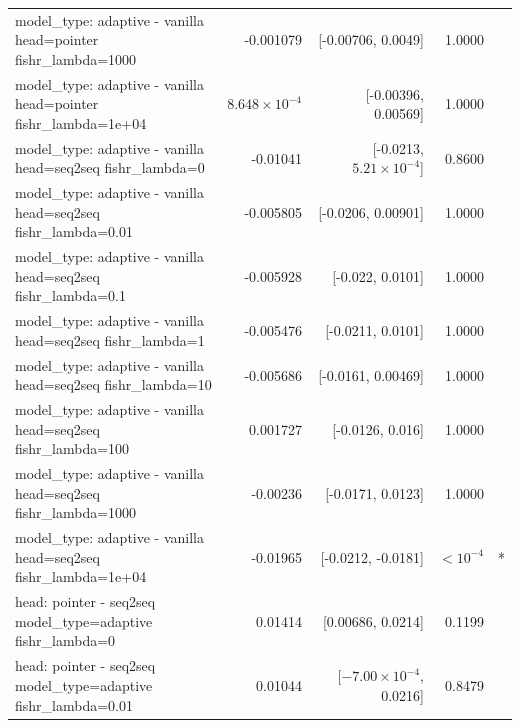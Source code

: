 \documentclass[10pt]{article}
\makeatletter
\newcommand{\stackcell}[1]{\begin{tabular}[t]{@{}l@{}}#1\end{tabular}}
\makeatother
\begin{document}
{\begin{longtable}{lrrrl}
\stackcell{model\_type: adaptive - vanilla\\\footnotesize head=pointer fishr\_lambda=1000 } & -0.001079 & [-0.00706, 0.0049] & 1.0000 & \\
\stackcell{model\_type: adaptive - vanilla\\\footnotesize head=pointer fishr\_lambda=1e+04 } & $8.648\times10^{-4}$ & [-0.00396, 0.00569] & 1.0000 & \\
\stackcell{model\_type: adaptive - vanilla\\\footnotesize head=seq2seq fishr\_lambda=0 } & -0.01041 & [-0.0213, $5.21\times10^{-4}$] & 0.8600 & \\
\stackcell{model\_type: adaptive - vanilla\\\footnotesize head=seq2seq fishr\_lambda=0.01 } & -0.005805 & [-0.0206, 0.00901] & 1.0000 & \\
\stackcell{model\_type: adaptive - vanilla\\\footnotesize head=seq2seq fishr\_lambda=0.1 } & -0.005928 & [-0.022, 0.0101] & 1.0000 & \\
\stackcell{model\_type: adaptive - vanilla\\\footnotesize head=seq2seq fishr\_lambda=1 } & -0.005476 & [-0.0211, 0.0101] & 1.0000 & \\
\stackcell{model\_type: adaptive - vanilla\\\footnotesize head=seq2seq fishr\_lambda=10 } & -0.005686 & [-0.0161, 0.00469] & 1.0000 & \\
\stackcell{model\_type: adaptive - vanilla\\\footnotesize head=seq2seq fishr\_lambda=100 } & 0.001727 & [-0.0126, 0.016] & 1.0000 & \\
\stackcell{model\_type: adaptive - vanilla\\\footnotesize head=seq2seq fishr\_lambda=1000 } & -0.00236 & [-0.0171, 0.0123] & 1.0000 & \\
\stackcell{model\_type: adaptive - vanilla\\\footnotesize head=seq2seq fishr\_lambda=1e+04 } & -0.01965 & [-0.0212, -0.0181] & $<10^{-4}$ & *\\
\stackcell{head: pointer - seq2seq\\\footnotesize model\_type=adaptive fishr\_lambda=0 } & 0.01414 & [0.00686, 0.0214] & 0.1199 & \\
\stackcell{head: pointer - seq2seq\\\footnotesize model\_type=adaptive fishr\_lambda=0.01 } & 0.01044 & [$-7.00\times10^{-4}$, 0.0216] & 0.8479 & \\

\end{longtable}}
\end{document}
